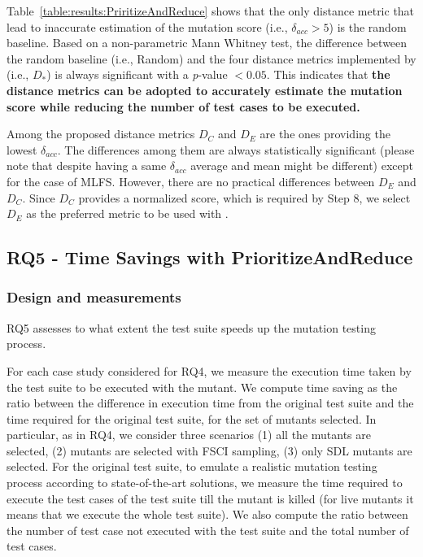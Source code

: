 Table~\ref{table:results:PriritizeAndReduce} shows that the only distance metric that lead to inaccurate estimation of the mutation score (i.e., $\delta_{acc}  > 5$) is the random baseline.
Based on a non-parametric Mann Whitney test, the difference between the random baseline (i.e., Random) and the four distance metrics implemented by \APPR (i.e., $D_*$) is always significant with a \textit{p}-value $< 0.05$. This indicates that \textbf{the \APPR distance metrics can be adopted to accurately estimate the mutation score while reducing the number of test cases to be executed.}

Among the proposed distance metrics $D_C$ and $D_E$ are the ones providing the lowest $\delta_{acc}$. The differences among them are always statistically significant (please note that despite having a same $\delta_{acc}$ average and mean might be different) except for the case of MLFS. 
However, there are no practical differences between $D_E$ and $D_C$. 
Since $D_C$ provides a normalized score, which is required by Step 8, we select $D_E$ as the preferred metric to be used with \APPR.



\subsection{RQ5 - Time Savings with PrioritizeAndReduce}

\subsubsection*{Design and measurements}

RQ5 assesses to what extent  the \APPR test suite speeds up the mutation testing process.


For each case study considered for RQ4, we measure the execution time taken by the \APPR test suite to be executed with the mutant.
We compute time saving as the ratio between the difference in execution time from the original test suite and the time required for the original test suite, for the set of mutants selected.
In particular, as in RQ4, we consider three scenarios (1) all the mutants are selected, (2) mutants are selected with FSCI sampling, (3) only SDL mutants are selected.
For the original test suite, to emulate a realistic mutation testing process according to state-of-the-art solutions, we measure the time required to execute the test cases of the test suite till the mutant is killed (for live mutants it means that we execute the whole test suite). 
We also compute 
the ratio between the number of test case not executed with the \APPR test suite and the total number of test cases.



